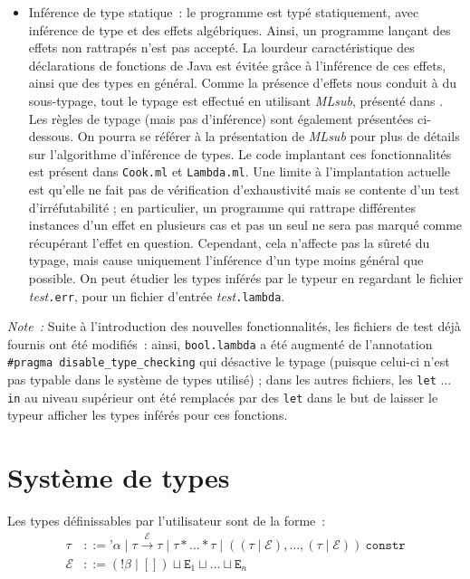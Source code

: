 \documentclass[a4paper,10pt]{article}
\begin{document}
\begin{itemize}
\item{Inférence de type statique~: le programme est typé statiquement, avec inférence de type et des effets algébriques. Ainsi, un programme lançant des effets non rattrapés n'est pas accepté. La lourdeur caractéristique des déclarations de fonctions de Java est évitée grâce à l'inférence de ces effets, ainsi que des types en général. Comme la présence d'effets nous conduit à du sous-typage, tout le typage est effectué en utilisant \emph{MLsub}, présenté dans \cite{dolan2017algebraic}. Les règles de typage (mais pas d'inférence) sont également présentées ci-dessous. On pourra se référer à la présentation de \emph{MLsub} pour plus de détails sur l'algorithme d'inférence de types. Le code implantant ces fonctionnalités est présent dans \texttt{Cook.ml} et \texttt{Lambda.ml}. Une limite à l'implantation actuelle est qu'elle ne fait pas de vérification d'exhaustivité mais se contente d'un test d'irréfutabilité ; en particulier, un programme qui rattrape différentes instances d'un effet en plusieurs cas et pas un seul ne sera pas marqué comme récupérant l'effet en question. Cependant, cela n'affecte pas la sûreté du typage, mais cause uniquement l'inférence d'un type moins général que possible. On peut étudier les types inférés par le typeur en regardant le fichier \emph{test}\texttt{.err}, pour un fichier d'entrée \emph{test}\texttt{.lambda}.}
\end{itemize}
\emph{Note~:} Suite à l'introduction des nouvelles fonctionnalités, les fichiers de test déjà fournis ont été modifiés~: ainsi, \texttt{bool.lambda} a été augmenté de l'annotation \texttt{\#{}pragma disable\_{}type\_{}checking} qui désactive le typage (puisque celui-ci n'est pas typable dans le système de types utilisé) ; dans les autres fichiers, les \texttt{let} ... \texttt{in} au niveau supérieur ont été remplacés par des \texttt{let} dans le but de laisser le typeur afficher les types inférés pour ces fonctions.

\section{Système de types}

Les types définissables par l'utilisateur sont de la forme~:
\begin{align*}
  \tau &::= \texttt{'}\alpha \mid \tau \xrightarrow{\mathcal{E}} \tau \mid \tau * \dots * \tau \mid ((\tau \mid \mathcal{E}), \dots, (\tau \mid \mathcal{E}))~\texttt{constr} \\
  \mathcal{E} &::= (\texttt{!}\beta \mid []) \sqcup \texttt{E}_1 \sqcup \dots \sqcup \texttt{E}_n
\end{align*}
\end{document}

